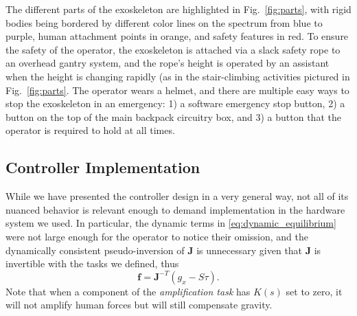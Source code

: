 \documentclass[utf8]{frontiersSCNS}
\begin{document}
The different parts of the exoskeleton are highlighted in Fig.~\ref{fig:parts}, with rigid bodies being bordered by different color lines on the spectrum from blue to purple, human attachment points in orange, and safety features in red. To ensure the safety of the operator, the exoskeleton is attached via a slack safety rope to an overhead gantry system, and the rope's height is operated by an assistant when the height is changing rapidly (as in the stair-climbing activities pictured in Fig.~\ref{fig:parts}. The operator wears a helmet, and there are multiple easy ways to stop the exoskeleton in an emergency: 1) a software emergency stop button, 2) a button on the top of the main backpack circuitry box, and 3) a button that the operator is required to hold at all times. 


\subsection{Controller Implementation}
While we have presented the controller design in a very general way, not all of its nuanced behavior is relevant enough to demand implementation in the hardware system we used. In particular, the dynamic terms in \eqref{eq:dynamic_equilibrium} were not large enough for the operator to notice their omission, and the dynamically consistent pseudo-inversion of $\mathbf J$ is unnecessary given that $\mathbf J$ is invertible with the tasks we defined, thus
\begin{equation}
\mathbf f = \mathbf J^{-T} (g_x - S\tau).
\end{equation}
Note that when a component of the \emph{amplification task} has $K(s)$ set to zero, it will not amplify human forces but will still compensate gravity.

\end{document}
